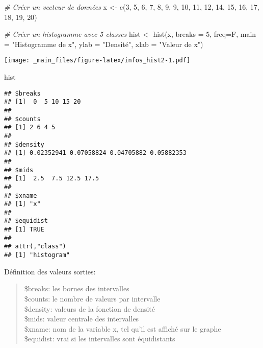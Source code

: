 \documentclass[
]{article}
\newenvironment{Shaded}{\begin{snugshade}}{\end{snugshade}}
\newcommand{\AttributeTok}[1]{\textcolor[rgb]{0.77,0.63,0.00}{#1}}
\newcommand{\CommentTok}[1]{\textcolor[rgb]{0.56,0.35,0.01}{\textit{#1}}}
\newcommand{\DecValTok}[1]{\textcolor[rgb]{0.00,0.00,0.81}{#1}}
\newcommand{\FunctionTok}[1]{\textcolor[rgb]{0.00,0.00,0.00}{#1}}
\newcommand{\NormalTok}[1]{#1}
\newcommand{\OtherTok}[1]{\textcolor[rgb]{0.56,0.35,0.01}{#1}}
\newcommand{\StringTok}[1]{\textcolor[rgb]{0.31,0.60,0.02}{#1}}
\begin{document}
\begin{Shaded}
\begin{Highlighting}[]
\CommentTok{\# Créer un vecteur de données}
\NormalTok{x }\OtherTok{\textless{}{-}} \FunctionTok{c}\NormalTok{(}\DecValTok{3}\NormalTok{, }\DecValTok{5}\NormalTok{, }\DecValTok{6}\NormalTok{, }\DecValTok{7}\NormalTok{, }\DecValTok{8}\NormalTok{, }\DecValTok{9}\NormalTok{, }\DecValTok{9}\NormalTok{, }\DecValTok{10}\NormalTok{, }\DecValTok{11}\NormalTok{, }\DecValTok{12}\NormalTok{, }\DecValTok{14}\NormalTok{, }\DecValTok{15}\NormalTok{, }\DecValTok{16}\NormalTok{, }\DecValTok{17}\NormalTok{, }\DecValTok{18}\NormalTok{, }\DecValTok{19}\NormalTok{, }\DecValTok{20}\NormalTok{)}

\CommentTok{\# Créer un histogramme avec 5 classes}
\NormalTok{hist }\OtherTok{\textless{}{-}} \FunctionTok{hist}\NormalTok{(x, }\AttributeTok{breaks =} \DecValTok{5}\NormalTok{, }\AttributeTok{freq=}\NormalTok{F, }\AttributeTok{main =} \StringTok{"Histogramme de x"}\NormalTok{, }\AttributeTok{ylab =} \StringTok{"Densité"}\NormalTok{, }\AttributeTok{xlab =} \StringTok{"Valeur de x"}\NormalTok{)}
\end{Highlighting}
\end{Shaded}

\texttt{[image: \_main\_files/figure-latex/infos\_hist2-1.pdf]}

\begin{Shaded}
\begin{Highlighting}[]
\NormalTok{hist}
\end{Highlighting}
\end{Shaded}

\begin{verbatim}
## $breaks
## [1]  0  5 10 15 20
## 
## $counts
## [1] 2 6 4 5
## 
## $density
## [1] 0.02352941 0.07058824 0.04705882 0.05882353
## 
## $mids
## [1]  2.5  7.5 12.5 17.5
## 
## $xname
## [1] "x"
## 
## $equidist
## [1] TRUE
## 
## attr(,"class")
## [1] "histogram"
\end{verbatim}

Définition des valeurs sorties:

\begin{quote}
\$breaks: les bornes des intervalles\\
\$counts: le nombre de valeurs par intervalle\\
\$density: valeurs de la fonction de densité\\
\$mids: valeur centrale des intervalles\\
\$xname: nom de la variable x, tel qu'il est affiché sur le graphe\\
\$equidist: vrai si les intervalles sont équidistants
\end{quote}
\end{document}
